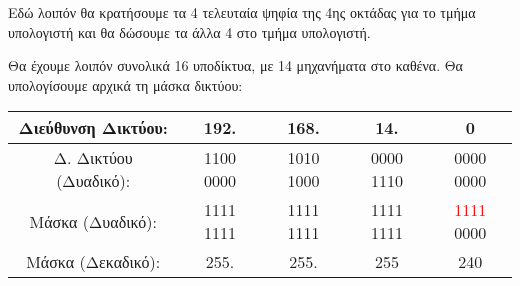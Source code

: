 Εδώ λοιπόν θα κρατήσουμε τα 4 τελευταία ψηφία της 4ης οκτάδας για το τμήμα υπολογιστή και θα δώσουμε τα άλλα 4 στο τμήμα υπολογιστή. 

Θα έχουμε λοιπόν συνολικά 16 υποδίκτυα, με 14 μηχανήματα στο καθένα.
Θα υπολογίσουμε αρχικά τη μάσκα δικτύου:

\begin{center}
\fontsize{9}{11}
\ttfamily
\begin{tabular}{|c|c|c|c|c|}
\hline
 Διεύθυνση Δικτύου: & 192. & 168. & 14. & 0 \\ 
\hline
 Δ. Δικτύου (Δυαδικό): & 1100 0000 & 1010 1000 & 0000 1110 & 0000 0000\\
\hline
 Μάσκα (Δυαδικό): & 1111 1111 & 1111 1111 & 1111 1111 & \textcolor{red}{1111} 0000\\
 \hline
 Μάσκα (Δεκαδικό): & 255. & 255. & 255 & 240\\
 \hline 
\end{tabular}
\normalfont
\end{center}

